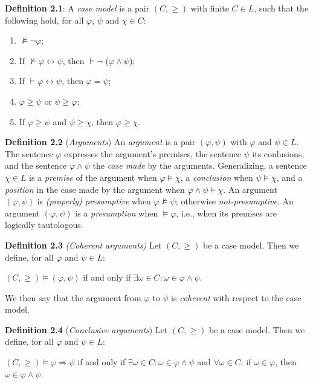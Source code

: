 \documentclass{IOS-Book-Article}
\begin{document}
\textbf{Definition 2.1}: A \textit{case model} is a pair $(C,  \geq)$ with finite $C \in L$, such that the following hold, for all $\varphi$, $\psi$ and $\chi \in C$: 
\begin{enumerate}
\item $\not \vDash \neg \varphi$;
\item If $\not \vDash \varphi \leftrightarrow \psi$, then $\vDash \neg$ ($\varphi \wedge \psi$);
\item If $\vDash \varphi \leftrightarrow \psi$, then $\varphi = \psi$;
\item $\varphi \geq \psi$ or $\psi \geq \varphi$;
\item If $\varphi \geq \psi$ and $\psi \geq \chi$, then $\varphi \geq \chi$.
\end{enumerate}

\textbf{Definition 2.2} (\textit{Arguments}) An \textit{argument} is a pair $(\varphi, \psi)$ with $\varphi$ and $\psi \in L$. The sentence $\varphi$ expresses the argument's premises, the sentence $\psi$ its conlusions, and the sentence $\varphi \wedge \psi$ the \textit{case made} by the arguments. Generalizing, a sentence $\chi \in L$ is a \textit{premise} of the argument when $\varphi \vDash \chi$, a \textit{conclusion} when $\psi \vDash \chi$, and a \textit{position} in the case made by the argument when $\varphi \wedge \psi \vDash \chi$. An argument $(\varphi, \psi)$ is \textit{(properly) presumptive} when $\varphi \not \vDash \psi$; otherwise \textit{not-presumptive}. An argument $(\varphi, \psi)$ is a \textit{presumption} when $\vDash \varphi$, i.e., when its premises are logically tautologous.

\textbf{Definition 2.3} \textit{(Coherent arguments)} Let $(C,  \geq)$ be a case model. Then we define, for all $\varphi$ and $\psi \in L$:

$(C,  \geq) \vDash (\varphi,  \psi)$ if and only if $\exists \omega \in C: \omega \in \varphi \wedge \psi$.

We then say that the argument from $\varphi$ to $\psi$ is \textit{coherent} with respect to the case model.

\textbf{Definition 2.4} (\textit{Conclusive arguments}) Let $(C,  \geq)$ be a case model. Then we define, for all $\varphi$ and $\psi \in L$:

$(C,  \geq) \vDash \varphi \Rightarrow \psi$ if and only if $\exists \omega \in C: \omega \in \varphi \wedge \psi$ and $\forall \omega \in C$: if $\omega \in \varphi$, then $\omega \in \varphi \wedge \psi$.
\end{document}
